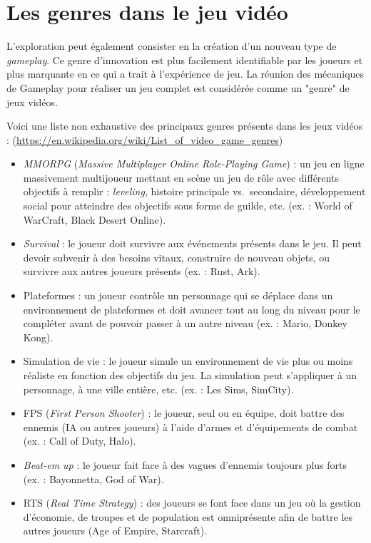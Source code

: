 \section{Les genres dans le jeu vidéo}
L'exploration peut également consister en la création d'un nouveau type de \emph{gameplay}.
Ce genre d'innovation est plus facilement identifiable par les joueurs et plus marquante en ce qui a trait \`a l'expérience de jeu.
La réunion des mécaniques de Gameplay pour réaliser un jeu complet est considérée comme un "genre" de jeux vidéos.



Voici une liste non exhaustive des principaux genres présents dans les jeux vidéos : (\url{https://en.wikipedia.org/wiki/List_of_video_game_genres})
\begin{itemize}
\label{MMORPG}
    \item \emph{MMORPG} (\emph{Massive Multiplayer Online Role-Playing Game}) : un jeu en ligne massivement multijoueur mettant en scène un jeu de rôle avec différents objectifs à remplir : \emph{leveling}, histoire principale vs.\ secondaire, développement social pour atteindre des objectifs sous forme de guilde, etc. (ex. : World of WarCraft, Black Desert Online).
    \item \emph{Survival} : le joueur doit survivre aux événements présents dans le jeu. Il peut devoir subvenir à des besoins vitaux, construire de nouveau objets, ou survivre aux autres joueurs présents (ex. : Rust, Ark).
    \item Plateformes : un joueur contrôle un personnage qui se déplace dans un environnement de plateformes et doit avancer tout au long du niveau pour le compl\'eter avant de pouvoir passer à un autre niveau (ex. : Mario, Donkey Kong).
    \item Simulation de vie : le joueur simule un environnement de vie plus ou moins réaliste en fonction des objectifs du jeu. La simulation peut s'appliquer à un personnage, à une ville entière, etc. (ex. : Les Sims, SimCity).
    \item FPS (\emph{First Person Shooter}) : le joueur, seul ou en équipe, doit battre des ennemis (IA ou autres joueurs) à l'aide d'armes et d'équipements de combat (ex. : Call of Duty, Halo).
    \item \emph{Beat-em up} : le joueur fait face à des vagues d'ennemis toujours plus forts (ex. : Bayonnetta, God of War).
    \item RTS (\emph{Real Time Strategy}) : des joueurs se font face dans un jeu o\`u la gestion d'économie, de troupes et de population est omniprésente afin de battre les autres joueurs (Age of Empire, Starcraft).

\end{itemize}
